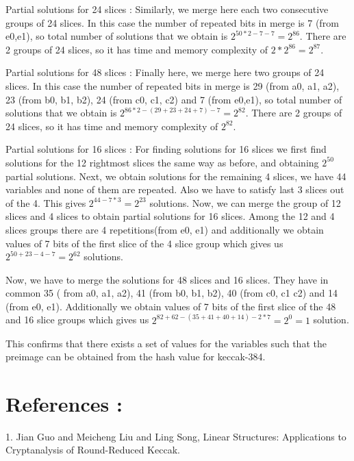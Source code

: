 \documentclass{article}
\begin{document}
\newpar
Partial solutions for 24 slices : Similarly, we merge here each two consecutive groups of 24 slices. In this case the number of repeated bits in merge is 7 (from e0,e1), so total number of solutions that we obtain is $2^{50*2 - 7 - 7 } = 2^{86}$. There are 2 groups of 24 slices, so it has time and memory complexity of $2*2^{86} = 2^{87}$.

\newpar
Partial solutions for 48 slices : Finally here, we merge here two groups of 24 slices. In this case the number of repeated bits in merge is 29 (from a0, a1, a2), 23 (from b0, b1, b2), 24 (from c0, c1, c2) and 7 (from e0,e1), so total number of solutions that we obtain is $2^{86*2 - (29 + 23 + 24 + 7) - 7 } = 2^{82}$. There are 2 groups of 24 slices, so it has time and memory complexity of $2^{82}$.

\newpar
Partial solutions for 16 slices : For finding solutions for 16 slices we first find solutions for the 12 rightmost slices the same way as before, and obtaining $2^{50}$ partial solutions. 
Next, we obtain solutions for the remaining 4 slices, we have 44 variables and none of them are repeated. Also we have to satisfy last 3 slices out of the 4. This gives $2^{44 - 7*3} = 2^{23}$ solutions.
Now, we can merge the group of 12 slices and 4 slices to obtain partial solutions for 16 slices. Among the 12 and 4 slices groups there are 4 repetitions(from e0, e1) and additionally we obtain values of 7 bits of the first slice of the 4 slice group which gives us $2^{50 + 23 - 4 -7} = 2^{62}$ solutions.

Now, we have to merge the solutions for 48 slices and 16 slices. They have in common 35 ( from a0, a1, a2), 41 (from b0, b1, b2), 40 (from c0, c1 c2) and 14 (from e0, e1). Additionally we obtain values of 7 bits of the first slice of the 48 and 16 slice groups which gives us $2^{82 + 62 - (35+ 41 + 40 + 14) - 2*7} = 2^{0} = 1$ solution.

This confirms that there exists a set of values for the variables such that the preimage can be obtained from the hash value for keccak-384.

\section{References :}

1. Jian Guo and Meicheng Liu and Ling Song, Linear Structures: Applications to Cryptanalysis of Round-Reduced Keccak.\newline
\end{document}
